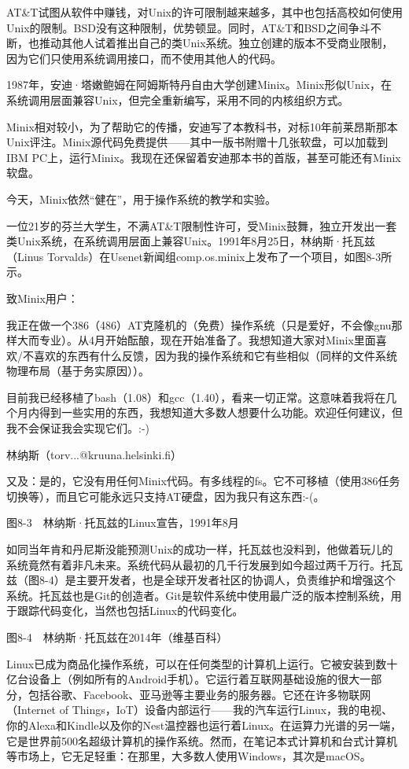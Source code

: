 \documentclass[a4paper,12pt,UTF8,twoside]{ctexbook}
\begin{document}
AT\&T试图从软件中赚钱，对Unix的许可限制越来越多，其中也包括高校如何使用Unix的限制。BSD没有这种限制，优势顿显。同时，AT\&T和BSD之间争斗不断，也推动其他人试着推出自己的类Unix系统。独立创建的版本不受商业限制，因为它们只使用系统调用接口，而不使用其他人的代码。

1987年，安迪·塔嫩鲍姆在阿姆斯特丹自由大学创建Minix。Minix形似Unix，在系统调用层面兼容Unix，但完全重新编写，采用不同的内核组织方式。

Minix相对较小，为了帮助它的传播，安迪写了本教科书，对标10年前莱昂斯那本Unix评注。Minix源代码免费提供——其中一版书附赠十几张软盘，可以加载到IBM PC上，运行Minix。我现在还保留着安迪那本书的首版，甚至可能还有Minix软盘。

今天，Minix依然“健在”，用于操作系统的教学和实验。

一位21岁的芬兰大学生，不满AT\&T限制性许可，受Minix鼓舞，独立开发出一套类Unix系统，在系统调用层面上兼容Unix。1991年8月25日，林纳斯·托瓦兹（Linus Torvalds）在Usenet新闻组comp.os.minix上发布了一个项目，如图8-3所示。



致Minix用户：

我正在做一个386（486）AT克隆机的（免费）操作系统（只是爱好，不会像gnu那样大而专业）。从4月开始酝酿，现在开始准备了。我想知道大家对Minix里面喜欢/不喜欢的东西有什么反馈，因为我的操作系统和它有些相似（同样的文件系统物理布局（基于务实原因））。

目前我已经移植了bash（1.08）和gcc（1.40），看来一切正常。这意味着我将在几个月内得到一些实用的东西，我想知道大多数人想要什么功能。欢迎任何建议，但我不会保证我会实现它们。:-)

林纳斯（torv...@kruuna.helsinki.fi）

又及：是的，它没有用任何Minix代码。有多线程的fs。它不可移植（使用386任务切换等），而且它可能永远只支持AT硬盘，因为我只有这东西:-(。



图8-3　林纳斯·托瓦兹的Linux宣告，1991年8月

如同当年肯和丹尼斯没能预测Unix的成功一样，托瓦兹也没料到，他做着玩儿的系统竟然有着非凡未来。系统代码从最初的几千行发展到如今超过两千万行。托瓦兹（图8-4）是主要开发者，也是全球开发者社区的协调人，负责维护和增强这个系统。托瓦兹也是Git的创造者。Git是软件系统中使用最广泛的版本控制系统，用于跟踪代码变化，当然也包括Linux的代码变化。



图8-4　林纳斯·托瓦兹在2014年（维基百科）

Linux已成为商品化操作系统，可以在任何类型的计算机上运行。它被安装到数十亿台设备上（例如所有的Android手机）。它运行着互联网基础设施的很大一部分，包括谷歌、Facebook、亚马逊等主要业务的服务器。它还在许多物联网（Internet of Things，IoT）设备内部运行——我的汽车运行Linux，我的电视、你的Alexa和Kindle以及你的Nest温控器也运行着Linux。在运算力光谱的另一端，它是世界前500名超级计算机的操作系统。然而，在笔记本式计算机和台式计算机等市场上，它无足轻重：在那里，大多数人使用Windows，其次是macOS。
\end{document}
